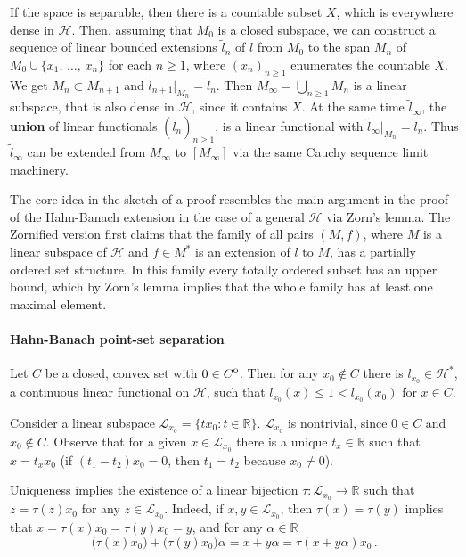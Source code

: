\documentclass[a4paper]{article}
\newcommand{\Hcal}{\mathcal{H}}
\newcommand{\real}{\mathbb{R}}
\newcommand{\interior}[1]{%
  {\kern0pt#1}^{\mathrm{o}}%
}
\newcommand{\Lcal}{\mathcal{L}}
\begin{document}
If the space is separable, then there is a countable subset $X$, which is everywhere
dense in $\Hcal$. Then, assuming that $M_0$ is a closed subspace, we can construct
a sequence of linear bounded extensions $\tilde{l}_n$ of $l$ from $M_0$ to the span
$M_n$ of $M_0 \cup \{x_1,\,\ldots, \,x_n\}$ for each $n\geq 1$, where $(x_n)_{n\geq1}$
enumerates the countable $X$. We get $M_n\subset M_{n+1}$ and $\tilde{l}_{n+1}\big\vert_{M_n}
= \tilde{l}_{n}$. Then $M_\infty = \bigcup_{n\geq1} M_n$ is a linear subspace, that
is also dense in $\Hcal$, since it contains $X$. At the same time $\tilde{l}_\infty$,
the {\bf union} of linear functionals $(\tilde{l}_n)_{n\geq1}$, is a linear functional
with $\tilde{l}_\infty\big\vert_{M_n} = \tilde{l}_{n}$. Thus $\tilde{l}_\infty$ can
be extended from $M_\infty$ to $[M_\infty]$ via the same Cauchy sequence limit machinery.

The core idea in the sketch of a proof resembles the main argument in the proof
of the Hahn-Banach extension in the case of a general $\Hcal$ via Zorn's lemma. The
Zornified version first claims that the family of all pairs $(M, f)$, where $M$ is
a linear subspace of $\Hcal$ and $f\in M^*$ is an extension of $l$ to $M$, has a
partially ordered set structure. In this family every totally ordered subset has
an upper bound, which by Zorn's lemma implies that the whole family has at least
one maximal element.


\paragraph{Hahn-Banach point-set separation} %
\label{par:hahn_banach_point_set_separation}

Let $C$ be a closed, convex set with $0\in \interior{C}$. Then for any $x_0\notin C$
there is $l_{x_0} \in \Hcal^*$, a continuous linear functional on $\Hcal$, such that
$l_{x_0}(x) \leq 1 < l_{x_0}(x_0)$ for $x\in C$.

Consider a linear subspace $\Lcal_{x_0} = \{t x_0\colon t\in \real\}$. $\Lcal_{x_0}$
is nontrivial, since $0 \in C$ and $x_0\notin C$. Observe that for a given $x\in \Lcal_{x_0}$
there is a unique $t_x \in \real$ such that $x = t_x x_0$ (if $(t_1 - t_2) x_0 = 0$,
then $t_1 = t_2$ because $x_0 \neq 0$).

Uniqueness implies the existence of a linear bijection $\tau\colon \Lcal_{x_0} \to
\real$ such that $z = \tau(z) x_0$ for any $z\in \Lcal_{x_0}$. Indeed, if $x, y\in
\Lcal_{x_0}$, then $\tau(x) = \tau(y)$ implies that $x = \tau(x) x_0 = \tau(y) x_0
= y$, and for any $\alpha\in \real$
\begin{equation*}
  \bigl( \tau(x) x_0 \bigr) + \bigl( \tau(y) x_0 \bigr) \alpha
    = x + y \alpha
    = \tau(x + y \alpha) x_0
  \,.
\end{equation*}
\end{document}
